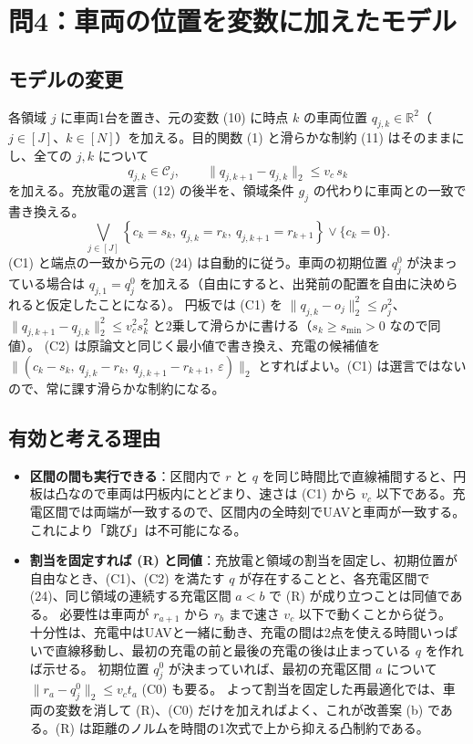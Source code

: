 \documentclass[uplatex,dvipdfmx,a4paper,11pt,jafont=haranoaji]{bxjsarticle}
\newcommand{\answerpart}[1]{\par\Needspace{6\baselineskip}\subsection*{#1}}
\newcommand{\norm}[1]{\lVert #1\rVert_2}
\begin{document}
\FloatBarrier
\section{問4：車両の位置を変数に加えたモデル}

\answerpart{モデルの変更}
各領域 $j$ に車両1台を置き、元の変数 (10) に時点 $k$ の車両位置 $q_{j,k}\in\mathbb R^2$（$j\in[J]$、$k\in[N]$）を加える。目的関数 (1) と滑らかな制約 (11) はそのままにし、全ての $j,k$ について
\begin{equation*}
  q_{j,k}\in\mathcal C_j,\qquad \norm{q_{j,k+1}-q_{j,k}}\le v_c\,s_k \tag{C1}
\end{equation*}
を加える。充放電の選言 (12) の後半を、領域条件 $g_j$ の代わりに車両との一致で書き換える。
\begin{equation*}
  \bigvee_{j\in[J]}\left\{c_k=s_k,\ q_{j,k}=r_k,\ q_{j,k+1}=r_{k+1}\right\}\vee\{c_k=0\}. \tag{C2}
\end{equation*}
(C1) と端点の一致から元の (24) は自動的に従う。車両の初期位置 $q_j^0$ が決まっている場合は $q_{j,1}=q_j^0$ を加える（自由にすると、出発前の配置を自由に決められると仮定したことになる）。
円板では (C1) を $\norm{q_{j,k}-o_j}^2\le\rho_j^2$、$\norm{q_{j,k+1}-q_{j,k}}^2\le v_c^2s_k^2$ と2乗して滑らかに書ける（$s_k\ge s_{\min}>0$ なので同値）。
(C2) は原論文と同じく最小値で書き換え、充電の候補値を $\norm{(c_k-s_k,\ q_{j,k}-r_k,\ q_{j,k+1}-r_{k+1},\ \varepsilon)}$ とすればよい。(C1) は選言ではないので、常に課す滑らかな制約になる。

\answerpart{有効と考える理由}
\begin{itemize}
  \item \textbf{区間の間も実行できる}：区間内で $r$ と $q$ を同じ時間比で直線補間すると、円板は凸なので車両は円板内にとどまり、速さは (C1) から $v_c$ 以下である。充電区間では両端が一致するので、区間内の全時刻でUAVと車両が一致する。これにより「跳び」は不可能になる。
  \item \textbf{割当を固定すれば (R) と同値}：充放電と領域の割当を固定し、初期位置が自由なとき、(C1)、(C2) を満たす $q$ が存在することと、各充電区間で (24)、同じ領域の連続する充電区間 $a<b$ で (R) が成り立つことは同値である。
  必要性は車両が $r_{a+1}$ から $r_b$ まで速さ $v_c$ 以下で動くことから従う。
  十分性は、充電中はUAVと一緒に動き、充電の間は2点を使える時間いっぱいで直線移動し、最初の充電の前と最後の充電の後は止まっている $q$ を作れば示せる。
  初期位置 $q_j^0$ が決まっていれば、最初の充電区間 $a$ について $\norm{r_a-q_j^0}\le v_ct_a$ (C0) も要る。
  よって割当を固定した再最適化では、車両の変数を消して (R)、(C0) だけを加えればよく、これが改善案 (b) である。(R) は距離のノルムを時間の1次式で上から抑える凸制約である。
\end{itemize}
\end{document}
